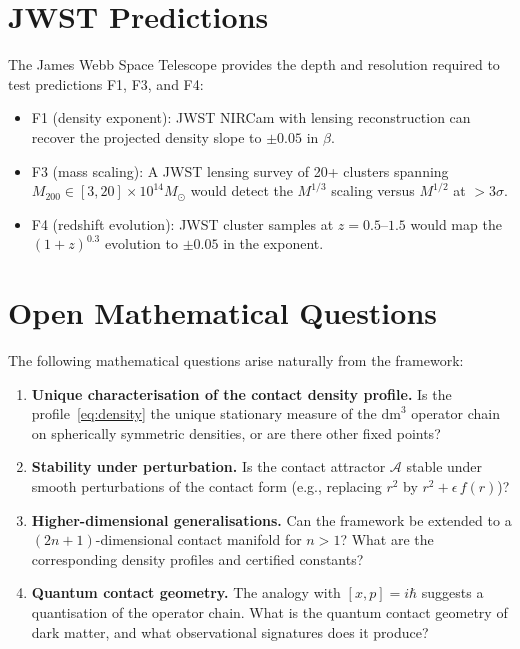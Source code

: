 \documentclass[11pt,a4paper,openright]{book}
\theoremstyle{dm3thm}
\theoremstyle{dm3def}
\newcommand{\dm}{\mathrm{dm}^3}
\begin{document}
\section{JWST Predictions}

The James Webb Space Telescope \citep{Gardner2023} provides the depth and
resolution required to test predictions F1, F3, and F4:
\begin{itemize}
  \item F1 (density exponent): JWST NIRCam with lensing reconstruction can
    recover the projected density slope to $\pm 0.05$ in $\beta$.
  \item F3 (mass scaling): A JWST lensing survey of 20+ clusters spanning
    $M_{200} \in [3,20]\times 10^{14}M_\odot$ would detect the $M^{1/3}$
    scaling versus $M^{1/2}$ at $>3\sigma$.
  \item F4 (redshift evolution): JWST cluster samples at $z = 0.5$--$1.5$
    would map the $(1+z)^{0.3}$ evolution to $\pm 0.05$ in the exponent.
\end{itemize}

\section{Open Mathematical Questions}

The following mathematical questions arise naturally from the framework:

\begin{enumerate}
  \item \textbf{Unique characterisation of the contact density profile.}
    Is the profile~\eqref{eq:density} the unique stationary measure of the
    $\dm$ operator chain on spherically symmetric densities, or are there
    other fixed points?

  \item \textbf{Stability under perturbation.}
    Is the contact attractor $\mathcal{A}$ stable under smooth perturbations
    of the contact form (e.g., replacing $r^2$ by $r^2 + \epsilon\,f(r)$)?

  \item \textbf{Higher-dimensional generalisations.}
    Can the framework be extended to a $(2n+1)$-dimensional contact manifold
    for $n > 1$?  What are the corresponding density profiles and certified
    constants?

  \item \textbf{Quantum contact geometry.}
    The analogy with $[x,p]=i\hbar$ suggests a quantisation of the
    operator chain.  What is the quantum contact geometry of dark matter,
    and what observational signatures does it produce?
\end{enumerate}
\end{document}
